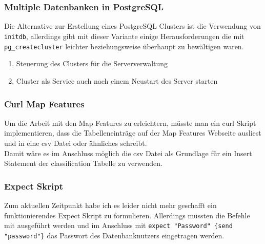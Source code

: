 \part{\appendixname}
\appendix
{} \chead{} \ohead{\headmark}
\ifoot{\printTitle}  \ofoot{}

\newpage
\setheadsepline{.5px}
\setfootsepline{.5px}
\section*{Multiple Datenbanken in PostgreSQL}\label{ch:clustering}
Die Alternative zur Erstellung eines PostgreSQL Clusters\cite{postgresql-cluster} ist die Verwendung von \lstinline[language=bash]|initdb|\cite{postgresql-cluster}, allerdings gibt mit dieser Variante einige Herausforderungen die mit \lstinline[language=bash]|pg_createcluster| leichter beziehungsweise überhaupt zu bewältigen waren.
\begin{enumerate}
	\item Steuerung des Clusters\cite{postgresql-cluster} für die Serververwaltung
	\item Cluster als Service auch nach einem Neustart des Server starten
\end{enumerate}

\section*{Curl Map Features}\label{ap:ch:curl-mapfeatures}
Um die Arbeit mit den Map Features\cite{osm-mapfeatures} zu erleichtern, müsste man ein curl Skript implementieren, dass die Tabelleneinträge auf der Map Features\cite{osm-mapfeatures} Webseite ausliest und in eine csv Datei oder ähnliches schreibt.\\

Damit wäre es im Anschluss möglich die csv Datei als Grundlage für ein Insert Statement der classification Tabelle zu verwenden.

\section*{Expect Skript}\label{ap:ch:expect}
Zum aktuellen Zeitpunkt habe ich es leider nicht mehr geschafft ein funktionierendes Expect Skript zu formulieren. Allerdings müssten die Befehle mit  ausgeführt werden und im Anschluss mit \lstinline[language={}]|expect "Password" {send "password"}| das Passwort des Datenbanknutzers eingetragen werden.

